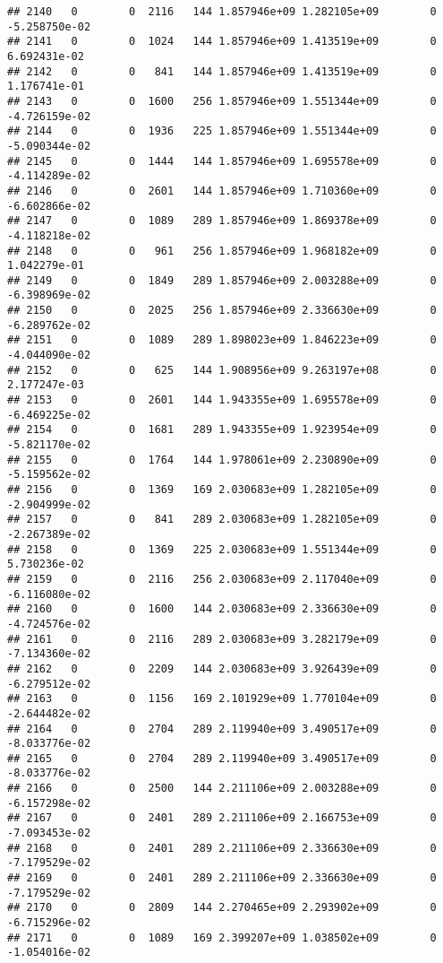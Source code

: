 \documentclass[
]{article}
\begin{document}
\begin{enumerate}
\begin{verbatim}
## 2140   0        0  2116   144 1.857946e+09 1.282105e+09        0 -5.258750e-02
## 2141   0        0  1024   144 1.857946e+09 1.413519e+09        0  6.692431e-02
## 2142   0        0   841   144 1.857946e+09 1.413519e+09        0  1.176741e-01
## 2143   0        0  1600   256 1.857946e+09 1.551344e+09        0 -4.726159e-02
## 2144   0        0  1936   225 1.857946e+09 1.551344e+09        0 -5.090344e-02
## 2145   0        0  1444   144 1.857946e+09 1.695578e+09        0 -4.114289e-02
## 2146   0        0  2601   144 1.857946e+09 1.710360e+09        0 -6.602866e-02
## 2147   0        0  1089   289 1.857946e+09 1.869378e+09        0 -4.118218e-02
## 2148   0        0   961   256 1.857946e+09 1.968182e+09        0  1.042279e-01
## 2149   0        0  1849   289 1.857946e+09 2.003288e+09        0 -6.398969e-02
## 2150   0        0  2025   256 1.857946e+09 2.336630e+09        0 -6.289762e-02
## 2151   0        0  1089   289 1.898023e+09 1.846223e+09        0 -4.044090e-02
## 2152   0        0   625   144 1.908956e+09 9.263197e+08        0  2.177247e-03
## 2153   0        0  2601   144 1.943355e+09 1.695578e+09        0 -6.469225e-02
## 2154   0        0  1681   289 1.943355e+09 1.923954e+09        0 -5.821170e-02
## 2155   0        0  1764   144 1.978061e+09 2.230890e+09        0 -5.159562e-02
## 2156   0        0  1369   169 2.030683e+09 1.282105e+09        0 -2.904999e-02
## 2157   0        0   841   289 2.030683e+09 1.282105e+09        0 -2.267389e-02
## 2158   0        0  1369   225 2.030683e+09 1.551344e+09        0  5.730236e-02
## 2159   0        0  2116   256 2.030683e+09 2.117040e+09        0 -6.116080e-02
## 2160   0        0  1600   144 2.030683e+09 2.336630e+09        0 -4.724576e-02
## 2161   0        0  2116   289 2.030683e+09 3.282179e+09        0 -7.134360e-02
## 2162   0        0  2209   144 2.030683e+09 3.926439e+09        0 -6.279512e-02
## 2163   0        0  1156   169 2.101929e+09 1.770104e+09        0 -2.644482e-02
## 2164   0        0  2704   289 2.119940e+09 3.490517e+09        0 -8.033776e-02
## 2165   0        0  2704   289 2.119940e+09 3.490517e+09        0 -8.033776e-02
## 2166   0        0  2500   144 2.211106e+09 2.003288e+09        0 -6.157298e-02
## 2167   0        0  2401   289 2.211106e+09 2.166753e+09        0 -7.093453e-02
## 2168   0        0  2401   289 2.211106e+09 2.336630e+09        0 -7.179529e-02
## 2169   0        0  2401   289 2.211106e+09 2.336630e+09        0 -7.179529e-02
## 2170   0        0  2809   144 2.270465e+09 2.293902e+09        0 -6.715296e-02
## 2171   0        0  1089   169 2.399207e+09 1.038502e+09        0 -1.054016e-02

\end{verbatim}
\end{enumerate}
\end{document}
